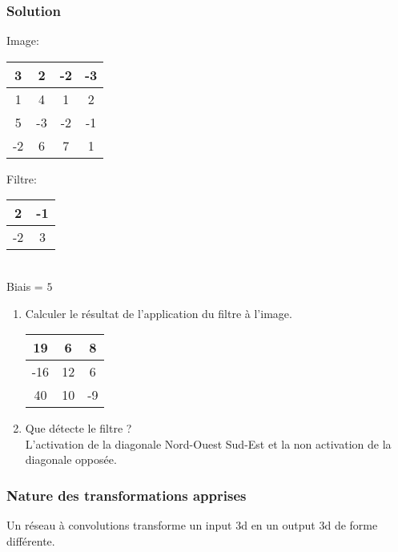 \documentclass{formation}
\begin{document}
\begin{frame}
  \frametitle{Solution}
  \begin{multicols}{2}
    Image:
    \begin{tabular}{|c|c|c|c|}
      \hline
      3 & 2 & -2 & -3 \\
      \hline
      1 & 4 & 1 & 2 \\
      \hline
      5 & -3 & -2 & -1 \\
      \hline
      -2 & 6 & 7 & 1 \\
      \hline
    \end{tabular}

    \columnbreak

    Filtre:
    \begin{tabular}{|c|c|}
      \hline
      2 & -1 \\
      \hline
      -2 & 3 \\
      \hline
    \end{tabular}\\[.5cm]
    Biais = $5$
  \end{multicols}
  \begin{enumerate}
  \item Calculer le résultat de l'application du filtre à l'image.\\
    \pause
    \begin{tabular}{|c|c|c|}
      \hline
      19 & 6 & 8 \\
      \hline
      -16 & 12 & 6 \\
      \hline
      40 & 10 & -9 \\
      \hline      
    \end{tabular}
    \pause
  \item Que détecte le filtre ? \\
    \pause
    L'activation de la diagonale Nord-Ouest Sud-Est et la non
    activation de la diagonale opposée.
  \end{enumerate}
\end{frame}

\begin{frame}
  \frametitle{Nature des transformations apprises}
  Un réseau à convolutions transforme un input 3d en un output 3d de
  forme différente.
\end{frame}
\end{document}
